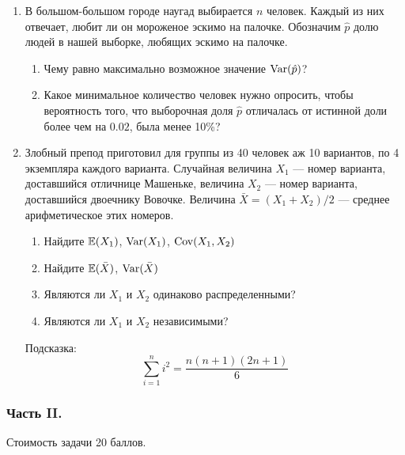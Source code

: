 \begin{enumerate}
\item В большом-большом городе наугад выбирается $n$ человек. Каждый из них отвечает,
любит ли он мороженое эскимо на палочке. Обозначим $\hat{p}$ долю людей в нашей выборке,
любящих эскимо на палочке.
\begin{enumerate}
\item Чему равно максимально возможное значение $\operatorname{Var}(\hat{p})$?
\item Какое минимальное количество человек нужно опросить, чтобы вероятность того,
что выборочная доля $\hat{p}$ отличалась от истинной доли более чем на $0.02$,
была менее 10\%?
\end{enumerate}


\item Злобный препод приготовил для группы из 40 человек аж 10 вариантов, по 4
экземпляра каждого варианта. Случайная величина $X_1$ — номер варианта, доставшийся
отличнице Машеньке, величина $X_2$ — номер варианта, доставшийся двоечнику Вовочке.
Величина $\bar{X} = (X_1 + X_2) / 2$ — среднее арифметическое этих номеров.
\begin{enumerate}
\item Найдите $\operatorname{\mathbb{E}}(X_1)$, $\operatorname{Var}(X_1)$, $\operatorname{Cov}(X_1,X_2)$
\item Найдите $\operatorname{\mathbb{E}}(\bar{X})$, $\operatorname{Var}(\bar{X})$
\item Являются ли $X_1$ и $X_2$ одинаково распределенными?
\item Являются ли $X_1$ и $X_2$ независимыми?
\end{enumerate}

Подсказка:
\[
\sum_{i=1}^{n} i^2=\frac{n(n+1)(2n+1)}{6}
\]
\end{enumerate}

\subsubsection*{Часть II.}
Стоимость задачи 20 баллов.  %

